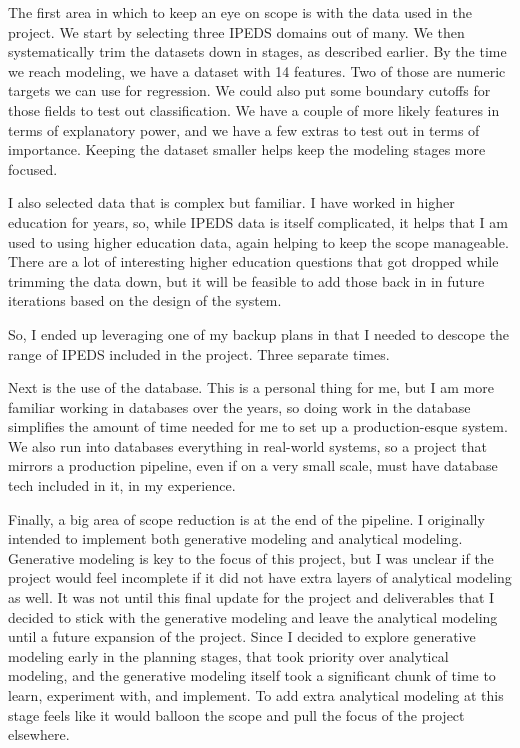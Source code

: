 \documentclass[sigconf, authorversion, nonacm]{acmart}
\begin{document}
    The first area in which to keep an eye on scope is with the data used in the project. We start by selecting three IPEDS domains out of many. We then systematically trim the datasets down in stages, as described earlier. By the time we reach modeling, we have a dataset with 14 features. Two of those are numeric targets we can use for regression. We could also put some boundary cutoffs for those fields to test out classification. We have a couple of more likely features in terms of explanatory power, and we have a few extras to test out in terms of importance. Keeping the dataset smaller helps keep the modeling stages more focused.

    I also selected data that is complex but familiar. I have worked in higher education for years, so, while IPEDS data is itself complicated, it helps that I am used to using higher education data, again helping to keep the scope manageable. There are a lot of interesting higher education questions that got dropped while trimming the data down, but it will be feasible to add those back in in future iterations based on the design of the system.

    So, I ended up leveraging one of my backup plans in that I needed to descope the range of IPEDS included in the project. Three separate times.

    Next is the use of the database. This is a personal thing for me, but I am more familiar working in databases over the years, so doing work in the database simplifies the amount of time needed for me to set up a production-esque system. We also run into databases everything in real-world systems, so a project that mirrors a production pipeline, even if on a very small scale, must have database tech included in it, in my experience.

    Finally, a big area of scope reduction is at the end of the pipeline. I originally intended to implement both generative modeling and analytical modeling. Generative modeling is key to the focus of this project, but I was unclear if the project would feel incomplete if it did not have extra layers of analytical modeling as well. It was not until this final update for the project and deliverables that I decided to stick with the generative modeling and leave the analytical modeling until a future expansion of the project. Since I decided to explore generative modeling early in the planning stages, that took priority over analytical modeling, and the generative modeling itself took a significant chunk of time to learn, experiment with, and implement. To add extra analytical modeling at this stage feels like it would balloon the scope and pull the focus of the project elsewhere.
\end{document}
